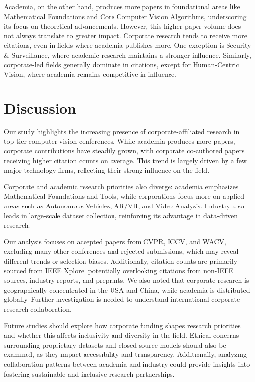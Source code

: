 \documentclass{article}
\begin{document}
Academia, on the other hand, produces more papers in foundational areas like Mathematical Foundations and Core Computer Vision Algorithms, underscoring its focus on theoretical advancements. However, this higher paper volume does not always translate to greater impact. Corporate research tends to receive more citations, even in fields where academia publishes more. One exception is Security \& Surveillance, where academic research maintains a stronger influence. Similarly, corporate-led fields generally dominate in citations, except for Human-Centric Vision, where academia remains competitive in influence. 
\vspace{-7pt}
\section{Discussion}
\vspace{-7pt}
Our study highlights the increasing presence of corporate-affiliated research in top-tier computer vision conferences. While academia produces more papers, corporate contributions have steadily grown, with corporate co-authored papers receiving higher citation counts on average. This trend is largely driven by a few major technology firms, reflecting their strong influence on the field.

Corporate and academic research priorities also diverge: academia emphasizes Mathematical Foundations and Tools, while corporations focus more on applied areas such as Autonomous Vehicles, AR/VR, and Video Analysis. Industry also leads in large-scale dataset collection, reinforcing its advantage in data-driven research.

Our analysis focuses on accepted papers from CVPR, ICCV, and WACV, excluding many other conferences and rejected submissions, which may reveal different trends or selection biases. Additionally, citation counts are primarily sourced from IEEE Xplore, potentially overlooking citations from non-IEEE sources, industry reports, and preprints. We also noted that corporate research is geographically concentrated in the USA and China, while academia is distributed globally. Further investigation is needed to understand international corporate research collaboration.

Future studies should explore how corporate funding shapes research priorities and whether this affects inclusivity and diversity in the field. Ethical concerns surrounding proprietary datasets and closed-source models should also be examined, as they impact accessibility and transparency. Additionally, analyzing collaboration patterns between academia and industry could provide insights into fostering sustainable and inclusive research partnerships.
\vspace{-7pt}
\end{document}

